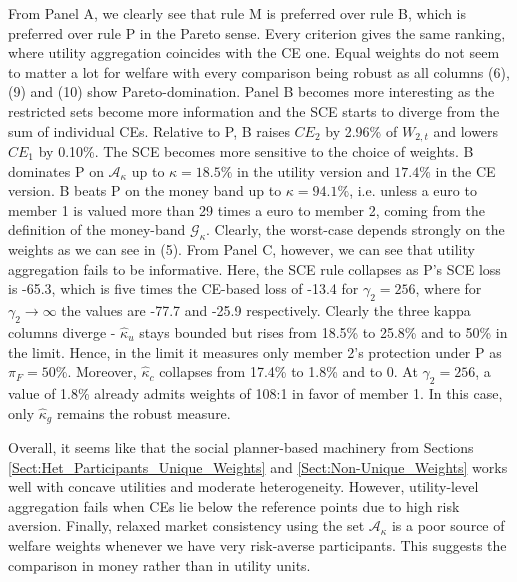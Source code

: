 From Panel A, we clearly see that rule M is preferred over rule B, which is preferred over rule P in the Pareto sense. Every criterion gives the same ranking, where utility aggregation coincides with the CE one. Equal weights do not seem to matter a lot for welfare with every comparison being robust as all columns (6), (9) and (10) show Pareto-domination. Panel B becomes more interesting as the restricted sets become more information and the SCE starts to diverge from the sum of individual CEs. Relative to P, B raises $CE_2$ by 2.96\% of $W_{2,t}$ and lowers $CE_1$ by 0.10\%. The SCE becomes more sensitive to the choice of weights. B dominates P on $\mathcal{A}_{\kappa}$ up to $\kappa = 18.5\%$ in the utility version and $17.4\%$ in the CE version. B beats P on the money band up to $\kappa=94.1\%$, i.e. unless a euro to member 1 is valued more than 29 times a euro to member 2, coming from the definition of the money-band $\mathcal{G}_\kappa$. Clearly, the worst-case depends strongly on the weights as we can see in (5). From Panel C, however, we can see that utility aggregation fails to be informative. Here, the SCE rule collapses as P's SCE loss is -65.3, which is five times the CE-based loss of -13.4 for $\gamma_2 = 256$, where for $\gamma_2 \to \infty$ the values are -77.7 and -25.9 respectively. Clearly the three kappa columns diverge - $\hat{\kappa}_u$ stays bounded but rises from 18.5\% to 25.8\% and to 50\% in the limit. Hence, in the limit it measures only member 2's protection under P as $\pi_F = 50\%$. Moreover, $\hat{\kappa}_c$ collapses from 17.4\% to 1.8\% and to 0. At $\gamma_2 = 256$, a value of 1.8\% already admits weights of 108:1 in favor of member 1. In this case, only $\hat{\kappa}_g$ remains the robust measure.

Overall, it seems like that the social planner-based machinery from Sections \ref{Sect:Het_Participants_Unique_Weights} and \ref{Sect:Non-Unique_Weights} works well with concave utilities and moderate heterogeneity. However, utility-level aggregation fails when CEs lie below the reference points due to high risk aversion. Finally, relaxed market consistency using the set $\mathcal{A}_\kappa$ is a poor source of welfare weights whenever we have very risk-averse participants. This suggests the comparison in money rather than in utility units.
